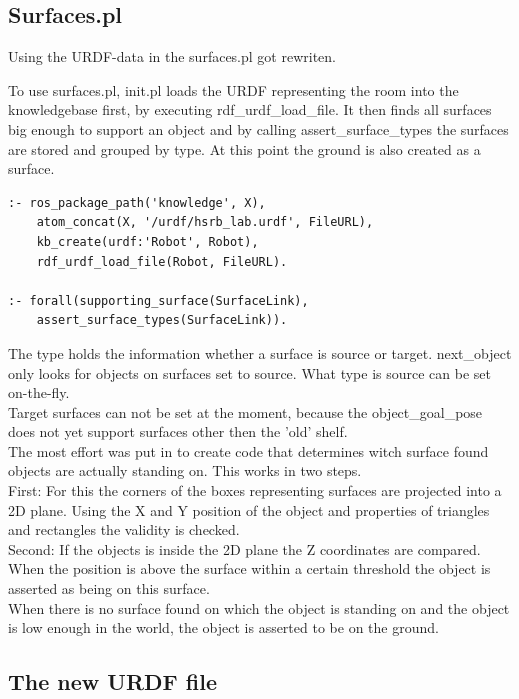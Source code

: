 \documentclass[main.tex]{subfiles}
\begin{document}
		\subsection{Surfaces.pl}
		Using the URDF-data in the surfaces.pl got rewriten.
		\newpage
		\lstset{language=Prolog,numbers=left}
		
		To use surfaces.pl, init.pl loads the URDF representing the room into the knowledgebase first, by executing rdf\_urdf\_load\_file.
		It then finds all surfaces big enough to support an object and by calling assert\_surface\_types the surfaces are stored and grouped by type. At this point the ground is also created as a surface.\\
		
		
		\begin{lstlisting}
:- ros_package_path('knowledge', X),
	atom_concat(X, '/urdf/hsrb_lab.urdf', FileURL),
	kb_create(urdf:'Robot', Robot),
	rdf_urdf_load_file(Robot, FileURL).	
		
:- forall(supporting_surface(SurfaceLink),
	assert_surface_types(SurfaceLink)).
		\end{lstlisting}
		
		
		The type holds the information whether a surface is source or target. next\_object only looks for objects on surfaces set to source. What type is source can be set on-the-fly.\\
		
		Target surfaces can not be set at the moment, because the object\_goal\_pose does not yet support surfaces other then the 'old' shelf.\\
		
		The most effort was put in to create code that determines witch surface found objects are actually standing on. This works in two steps.\\
		First: For this the corners of the boxes representing surfaces are projected into a 2D plane. Using the X and Y position of the object and properties of triangles and rectangles the validity is checked.\\
		Second: If the objects is inside the 2D plane the Z coordinates are compared. When the position is above the surface within a certain threshold the object is asserted as being on this surface.\\
		When there is no surface found on which the object is standing on and the object is low enough in the world, the object is asserted to be on the ground.\\
		
		
		\subsection{The new URDF file}
		
\end{document}
